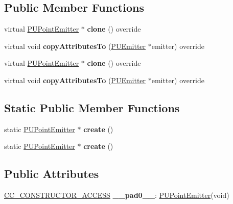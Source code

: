 \subsection*{Public Member Functions}
\begin{DoxyCompactItemize}
\item 
\mbox{\label{classPUPointEmitter_a8018ceb0b56a4a62b646f4ec76b8b73c}} 
virtual \hyperlink{classPUPointEmitter}{P\+U\+Point\+Emitter} $\ast$ {\bfseries clone} () override
\item 
\mbox{\label{classPUPointEmitter_a9d7983bfe0a98cacb7fff22d5236c808}} 
virtual void {\bfseries copy\+Attributes\+To} (\hyperlink{classPUEmitter}{P\+U\+Emitter} $\ast$emitter) override
\item 
\mbox{\label{classPUPointEmitter_a467cbd159de9d58d133864e188927c6e}} 
virtual \hyperlink{classPUPointEmitter}{P\+U\+Point\+Emitter} $\ast$ {\bfseries clone} () override
\item 
\mbox{\label{classPUPointEmitter_a194e839808ea6c33aa91198f35d1f0bd}} 
virtual void {\bfseries copy\+Attributes\+To} (\hyperlink{classPUEmitter}{P\+U\+Emitter} $\ast$emitter) override
\end{DoxyCompactItemize}
\subsection*{Static Public Member Functions}
\begin{DoxyCompactItemize}
\item 
\mbox{\label{classPUPointEmitter_a8541600f93b2ef4fc6017689d4f526dd}} 
static \hyperlink{classPUPointEmitter}{P\+U\+Point\+Emitter} $\ast$ {\bfseries create} ()
\item 
\mbox{\label{classPUPointEmitter_a188c20a54e085099a506f25fda68ac1a}} 
static \hyperlink{classPUPointEmitter}{P\+U\+Point\+Emitter} $\ast$ {\bfseries create} ()
\end{DoxyCompactItemize}
\subsection*{Public Attributes}
\begin{DoxyCompactItemize}
\item 
\mbox{\label{classPUPointEmitter_a3a1cbd1989c086a2a0745796783747ba}} 
\hyperlink{_2cocos2d_2cocos_2base_2ccConfig_8h_a25ef1314f97c35a2ed3d029b0ead6da0}{C\+C\+\_\+\+C\+O\+N\+S\+T\+R\+U\+C\+T\+O\+R\+\_\+\+A\+C\+C\+E\+SS} {\bfseries \+\_\+\+\_\+pad0\+\_\+\+\_\+}\+: \hyperlink{classPUPointEmitter}{P\+U\+Point\+Emitter}(void)
\end{DoxyCompactItemize}
